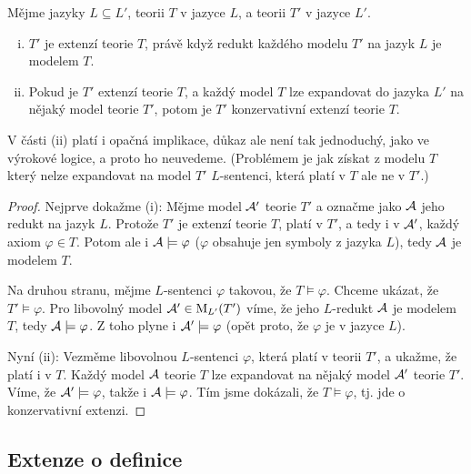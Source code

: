 \begin{proposition}\label{proposition:semantic-conditions-for-extensions}
    Mějme jazyky $L\subseteq L'$, teorii $T$ v jazyce $L$, a teorii $T'$ v jazyce $L'$.
    \begin{enumerate}[(i)]
        \item $T'$ je extenzí teorie $T$, právě když redukt každého modelu $T'$ na jazyk $L$ je modelem $T$.
        \item Pokud je $T'$ extenzí teorie $T$, a každý model $T$ lze expandovat do jazyka $L'$ na nějaký model teorie $T'$, potom je $T'$ konzervativní extenzí teorie $T$.
    \end{enumerate}
\end{proposition}
\begin{remark}
    V části (ii) platí i opačná implikace, důkaz ale není tak jednoduchý, jako ve výrokové logice, a proto ho neuvedeme. (Problémem je jak získat z modelu $T$ který nelze expandovat na model $T'$ $L$-sentenci, která platí v $T$ ale ne v $T'$.)
\end{remark} 
\begin{proof}
    Nejprve dokažme (i): Mějme model $\mathcal{A}'$ teorie $T'$ a označme jako $\mathcal{A}$ jeho redukt na jazyk $L$. Protože $T'$ je extenzí teorie $T$, platí v $T'$, a tedy i v $\mathcal{A}'$, každý axiom $\varphi\in T$. Potom ale i $\mathcal{A}\models\varphi$ ($\varphi$ obsahuje jen symboly z jazyka $L$), tedy $\mathcal{A}$ je modelem $T$.

    Na druhou stranu, mějme $L$-sentenci $\varphi$ takovou, že $T\models\varphi$. Chceme ukázat, že $T'\models\varphi$. Pro libovolný model $\mathcal{A}'\in\operatorname{M}_{L'}(T')$ víme, že jeho $L$-redukt $\mathcal{A}$ je modelem $T$, tedy $\mathcal{A}\models\varphi$. Z toho plyne i $\mathcal{A}'\models\varphi$ (opět proto, že $\varphi$ je v jazyce $L$).

    Nyní (ii): Vezměme libovolnou $L$-sentenci $\varphi$, která platí v teorii $T'$, a ukažme, že platí i v $T$. Každý model $\mathcal{A}$ teorie $T$ lze expandovat na nějaký model $\mathcal{A}'$ teorie $T'$. Víme, že $\mathcal{A}'\models\varphi$, takže i $\mathcal{A}\models\varphi$. Tím jsme dokázali, že $T\models\varphi$, tj. jde o konzervativní extenzi.
    
\end{proof}


\subsection{Extenze o definice}\label{subsection:extension-by-definition}

